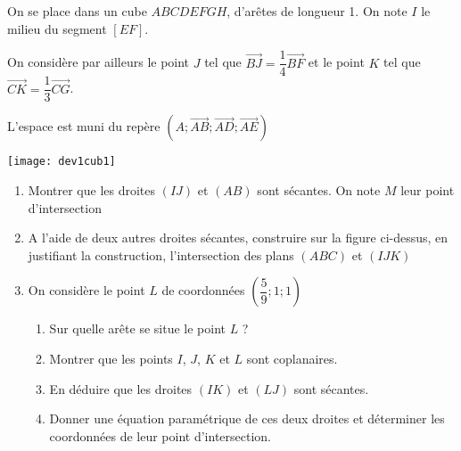 \documentclass[11pt,fleqn, openany]{book} %
\begin{document}
\begin{exercise}\hspace{0pt}

\begin{minipage}{0.6\linewidth}On se place dans un cube $ABCDEFGH$, d'arêtes de longueur 1.
On note $I$ le milieu du segment $[EF]$.

On considère par ailleurs le point $J$ tel que $\overrightarrow{BJ}=\dfrac{1}{4}\overrightarrow{BF}$ et le point $K$ tel que $\overrightarrow{CK}=\dfrac{1}{3}\overrightarrow{CG}$. 

L'espace est muni du repère $(A;\overrightarrow{AB};\overrightarrow{AD};\overrightarrow{AE})$
\end{minipage}\hfill\begin{minipage}{0.35\linewidth}
\begin{center}
\texttt{[image: dev1cub1]}
\end{center}

\end{minipage}

\vskip80pt
\begin{enumerate}
\item Montrer que les droites $(IJ)$ et $(AB)$ sont sécantes. On note $M$ leur point d'intersection
\item A l'aide de deux autres droites sécantes, construire sur la figure ci-dessus, en justifiant la construction, l'intersection des plans $(ABC)$ et $(IJK)$
\item On considère le point $L$ de coordonnées $\left(\dfrac{5}{9};1;1\right)$
\begin{enumerate}
\item Sur quelle arête se situe le point $L$ ?
\item Montrer que les points $I$, $J$, $K$ et $L$ sont coplanaires.
\item En déduire que les droites $(IK)$ et $(LJ)$ sont sécantes.
\item Donner une équation paramétrique  de ces deux droites et déterminer les coordonnées de leur point d'intersection.
\end{enumerate}
\end{enumerate}\end{exercise}
\end{document}

